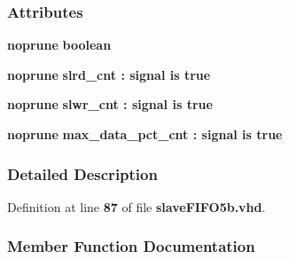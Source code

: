 \subsubsection*{Attributes}
 \begin{DoxyCompactItemize}
\item 
{\bf noprune} {\bfseries \textcolor{comment}{boolean}\textcolor{vhdlchar}{ }} 
\item 
{\bf noprune} {\bfseries {\bfseries {\bf slrd\+\_\+cnt}} \textcolor{vhdlchar}{ }\textcolor{vhdlchar}{\+:}\textcolor{vhdlchar}{ }\textcolor{keywordflow}{signal}\textcolor{vhdlchar}{ }\textcolor{keywordflow}{is}\textcolor{vhdlchar}{ }\textcolor{vhdlchar}{ }\textcolor{vhdlchar}{ }\textcolor{vhdlchar}{ }\textcolor{vhdlchar}{true}\textcolor{vhdlchar}{ }} 
\item 
{\bf noprune} {\bfseries {\bfseries {\bf slwr\+\_\+cnt}} \textcolor{vhdlchar}{ }\textcolor{vhdlchar}{\+:}\textcolor{vhdlchar}{ }\textcolor{keywordflow}{signal}\textcolor{vhdlchar}{ }\textcolor{keywordflow}{is}\textcolor{vhdlchar}{ }\textcolor{vhdlchar}{ }\textcolor{vhdlchar}{ }\textcolor{vhdlchar}{ }\textcolor{vhdlchar}{true}\textcolor{vhdlchar}{ }} 
\item 
{\bf noprune} {\bfseries {\bfseries {\bf max\+\_\+data\+\_\+pct\+\_\+cnt}} \textcolor{vhdlchar}{ }\textcolor{vhdlchar}{\+:}\textcolor{vhdlchar}{ }\textcolor{keywordflow}{signal}\textcolor{vhdlchar}{ }\textcolor{keywordflow}{is}\textcolor{vhdlchar}{ }\textcolor{vhdlchar}{ }\textcolor{vhdlchar}{ }\textcolor{vhdlchar}{ }\textcolor{vhdlchar}{true}\textcolor{vhdlchar}{ }} 
\end{DoxyCompactItemize}


\subsubsection{Detailed Description}


Definition at line {\bf 87} of file {\bf slave\+F\+I\+F\+O5b.\+vhd}.



\subsubsection{Member Function Documentation}

